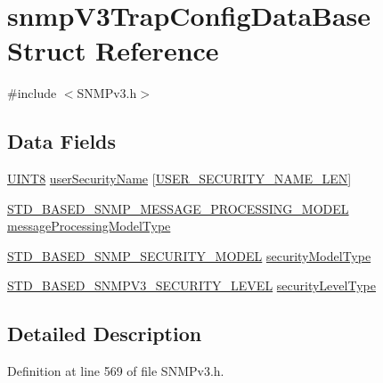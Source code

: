 \hypertarget{structsnmp_v3_trap_config_data_base}{}\section{snmp\+V3\+Trap\+Config\+Data\+Base Struct Reference}
\label{structsnmp_v3_trap_config_data_base}


{\ttfamily \#include $<$S\+N\+M\+Pv3.\+h$>$}

\subsection*{Data Fields}
\begin{DoxyCompactItemize}
\item 
\hyperlink{_generic_type_defs_8h_ab27e9918b538ce9d8ca692479b375b6a}{U\+I\+N\+T8} \hyperlink{structsnmp_v3_trap_config_data_base_a233710cfa854c724130d58ddf3243310}{user\+Security\+Name} \mbox{[}\hyperlink{_s_n_m_pv3_8h_a810f6afb9cdcd489918df3bd89a1c2f2}{U\+S\+E\+R\+\_\+\+S\+E\+C\+U\+R\+I\+T\+Y\+\_\+\+N\+A\+M\+E\+\_\+\+L\+E\+N}\mbox{]}
\item 
\hyperlink{_s_n_m_pv3_8h_a33d685c866df5bc9cebb197904b44849}{S\+T\+D\+\_\+\+B\+A\+S\+E\+D\+\_\+\+S\+N\+M\+P\+\_\+\+M\+E\+S\+S\+A\+G\+E\+\_\+\+P\+R\+O\+C\+E\+S\+S\+I\+N\+G\+\_\+\+M\+O\+D\+E\+L} \hyperlink{structsnmp_v3_trap_config_data_base_a1ef4f3a9b17982b46ceb651545770648}{message\+Processing\+Model\+Type}
\item 
\hyperlink{_s_n_m_pv3_8h_a9660f959fba22233b583b762ef1f9cdd}{S\+T\+D\+\_\+\+B\+A\+S\+E\+D\+\_\+\+S\+N\+M\+P\+\_\+\+S\+E\+C\+U\+R\+I\+T\+Y\+\_\+\+M\+O\+D\+E\+L} \hyperlink{structsnmp_v3_trap_config_data_base_afe6d250cb39427f4b88ee81ad3ab5c30}{security\+Model\+Type}
\item 
\hyperlink{_s_n_m_pv3_8h_a0940bc79f7eb28323f6c2f5b6aa82409}{S\+T\+D\+\_\+\+B\+A\+S\+E\+D\+\_\+\+S\+N\+M\+P\+V3\+\_\+\+S\+E\+C\+U\+R\+I\+T\+Y\+\_\+\+L\+E\+V\+E\+L} \hyperlink{structsnmp_v3_trap_config_data_base_a5daae3c861902f1b7764fdfabd8bb890}{security\+Level\+Type}
\end{DoxyCompactItemize}


\subsection{Detailed Description}


Definition at line 569 of file S\+N\+M\+Pv3.\+h.



